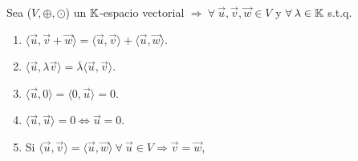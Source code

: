 \begin{theorem}
    \label{teo_6.1_FD}
    Sea  ($V, \oplus, \odot$) un $\mathbb{K}$-espacio vectorial $\Rightarrow \: \forall \: \vec{u}, \vec{v}, \vec{w} \in V$ y $\forall \: \lambda \in \mathbb{K}$ s.t.q. \begin{enumerate}
        \item $\langle \vec{u}, \vec{v}+\vec{w} \rangle=\langle \vec{u},\vec{v}\rangle + \langle \vec{u},\vec{w} \rangle
        $.
        \item $\langle \vec{u}, \lambda \vec{v} \rangle=\overline{\lambda}\langle \vec{u}, \vec{v} \rangle$.
        \item $\langle\vec{u}, 0 \rangle=\langle 0 , \vec{u} \rangle = 0 $.
        \item $\langle \vec{u}, \vec{u} \rangle=0 \iff \vec{u}=0$.
        \item Si $\langle \vec{u}, \vec{v} \rangle = \langle \vec{u}, \vec{w} \rangle \: \forall \: \vec{u} \in V \Rightarrow \vec{v}=\vec{w}$, 
    \end{enumerate}
\end{theorem}

